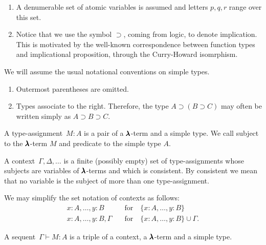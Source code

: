 \begin{remark} \hfill
  \begin{enumerate}
  \item A denumerable set of atomic variables is assumed and letters $p, q, r$ range over this set.
  \item Notice that we use the symbol $\supset$, coming from logic, to denote implication.
    This is motivated by the well-known correspondence between function types and implicational proposition, through the Curry-Howard isomrphism.
  \end{enumerate}
\end{remark}

\begin{notation}
  We will assume the usual notational conventions on simple types. 
  \begin{enumerate}
  \item Outermost parentheses are omitted.
  \item Types associate to the right. Therefore, the type $A \supset (B \supset C)$ may often be written simply as $A \supset B \supset C$.
  \end{enumerate}
\end{notation}

\begin{definition}
  A type-assignment~$M : A$ is a pair of a $\pmb{\lambda}$-term and a simple type.
  We call subject to the $\pmb{\lambda}$-term $M$ and predicate to the simple type $A$.
\end{definition}

\begin{definition}[Context]
  A context~$\Gamma, \Delta, \dots$ is a finite (possibly empty) set of type-assignments whose subjects are variables of $\pmb{\lambda}$-terms and which is consistent. By consistent we mean that no variable is the subject of more than one type-assignment.
\end{definition}

\begin{notation} We may simplify the set notation of contexts as follows:
  \begin{align*}
    x:A, \dots, y:B         \quad &\text{for} \quad \{ x:A, \dots, y:B \} \\
    x:A, \dots, y:B, \Gamma \quad &\text{for} \quad \{ x:A, \dots, y:B \} \cup \Gamma.
  \end{align*}
\end{notation}

\begin{definition}[Sequent]
  A sequent~$\Gamma \vdash M:A$ is a triple of a context, a $\pmb{\lambda}$-term and a simple type.
\end{definition}

